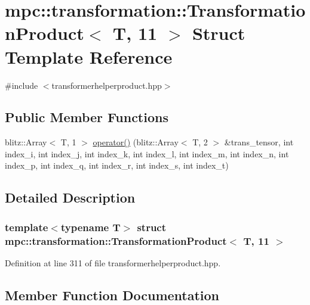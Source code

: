 \hypertarget{structmpc_1_1transformation_1_1_transformation_product_3_01_t_00_0111_01_4}{}\section{mpc\+:\+:transformation\+:\+:Transformation\+Product$<$ T, 11 $>$ Struct Template Reference}
\label{structmpc_1_1transformation_1_1_transformation_product_3_01_t_00_0111_01_4}


{\ttfamily \#include $<$transformerhelperproduct.\+hpp$>$}

\subsection*{Public Member Functions}
\begin{DoxyCompactItemize}
\item 
blitz\+::\+Array$<$ T, 1 $>$ \mbox{\hyperlink{structmpc_1_1transformation_1_1_transformation_product_3_01_t_00_0111_01_4_a7b4f4922dfb3115f3f26256c6524db69}{operator()}} (blitz\+::\+Array$<$ T, 2 $>$ \&trans\+\_\+tensor, int index\+\_\+i, int index\+\_\+j, int index\+\_\+k, int index\+\_\+l, int index\+\_\+m, int index\+\_\+n, int index\+\_\+p, int index\+\_\+q, int index\+\_\+r, int index\+\_\+s, int index\+\_\+t)
\end{DoxyCompactItemize}


\subsection{Detailed Description}
\subsubsection*{template$<$typename T$>$\newline
struct mpc\+::transformation\+::\+Transformation\+Product$<$ T, 11 $>$}



Definition at line 311 of file transformerhelperproduct.\+hpp.



\subsection{Member Function Documentation}
\mbox{\label{structmpc_1_1transformation_1_1_transformation_product_3_01_t_00_0111_01_4_a7b4f4922dfb3115f3f26256c6524db69}} 
